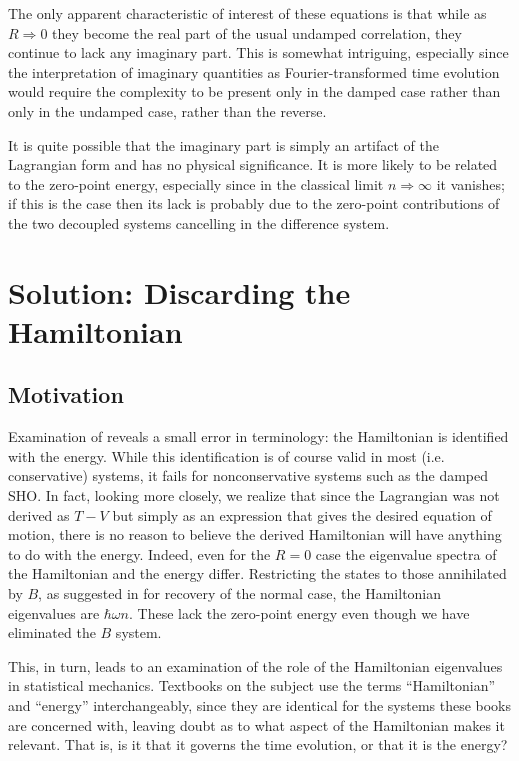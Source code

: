 The only apparent characteristic of interest of these equations is that while
as $R \Rightarrow 0$ they become the real part of the usual undamped
correlation, they continue to lack any imaginary part.  This is somewhat
intriguing, especially since the interpretation of imaginary quantities as
Fourier-transformed time evolution would require the complexity to be present
only in the damped case rather than only in the undamped case, rather than
the reverse.  

It is quite possible that the imaginary part is simply
an artifact of the Lagrangian form and has no physical significance.  It is
more likely to be related to the zero-point energy, especially since in the
classical limit $n \Rightarrow \infty$ it vanishes; if this is the case then
its lack is probably due to the zero-point contributions of the two decoupled
systems cancelling in the difference system.

\newpage
\chapter{Solution:  Discarding the Hamiltonian}

\section{Motivation}

Examination of \cite{ft:fest} reveals a small error in terminology:  the
Hamiltonian is identified with the energy.  While this identification is of
course valid in most (i.e. conservative) systems, it fails for nonconservative
systems such as the damped SHO.  In fact, looking more closely, we realize
that since the Lagrangian was not derived as $T - V$ but simply as an
expression that gives the desired equation of motion, there is no reason to
believe the derived Hamiltonian will have anything to do with the energy.
Indeed, even for the $R = 0$ case the eigenvalue spectra of the Hamiltonian
and the energy differ.  Restricting the states to those annihilated by $B$,
as suggested in \cite{ft:fest} for recovery of the normal case, the Hamiltonian
eigenvalues are $\hbar \omega n$.  These lack the zero-point energy even though
we have eliminated the $B$ system.

This, in turn, leads to an examination of the role of the Hamiltonian
eigenvalues in statistical mechanics.  Textbooks on the subject use the terms
``Hamiltonian'' and ``energy'' interchangeably, since they are identical for
the systems these books are concerned with, leaving doubt as to what aspect
of the Hamiltonian makes it relevant.  That is, is it that it governs the
time evolution, or that it is the energy?

